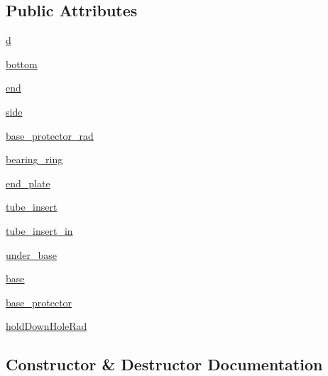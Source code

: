\subsection*{Public Attributes}
\begin{DoxyCompactItemize}
\item 
\hyperlink{classboxes_1_1_turret_a237b36a79f2060a19c9f445eb2c0b0c0}{d}
\item 
\hyperlink{classboxes_1_1_turret_a4175ec32cd0bc70355aaa2a7d46a1814}{bottom}
\item 
\hyperlink{classboxes_1_1_turret_af346dccee6a020fe485e1849d3597eaf}{end}
\item 
\hyperlink{classboxes_1_1_turret_a1f5dd6ea8b99161aefb38d331cb093f4}{side}
\item 
\hyperlink{classboxes_1_1_turret_aaae8d70aa9dbb9ece6843b17158e3756}{base\+\_\+protector\+\_\+rad}
\item 
\hyperlink{classboxes_1_1_turret_afe961dea5213247a7092ada092737eb9}{bearing\+\_\+ring}
\item 
\hyperlink{classboxes_1_1_turret_a272bc7853e19ca7a75349c6468be7aed}{end\+\_\+plate}
\item 
\hyperlink{classboxes_1_1_turret_a54964571038999e8bb1d1fdd7925d280}{tube\+\_\+insert}
\item 
\hyperlink{classboxes_1_1_turret_ae048a79551ef7acf28b6f4621a2ef5a4}{tube\+\_\+insert\+\_\+in}
\item 
\hyperlink{classboxes_1_1_turret_a1b7fc41b7419700d5ec007f56ba8a3cc}{under\+\_\+base}
\item 
\hyperlink{classboxes_1_1_turret_a7232707a55553fe266619e76b836313b}{base}
\item 
\hyperlink{classboxes_1_1_turret_a6f0186ebbe28ed264198027539752e1f}{base\+\_\+protector}
\item 
\hyperlink{classboxes_1_1_turret_a1ec72e74c3d0fec8d0723fb171a636fb}{hold\+Down\+Hole\+Rad}
\end{DoxyCompactItemize}


\subsection{Constructor \& Destructor Documentation}
\hypertarget{classboxes_1_1_turret_a61691e8112654e9fc0d7ea87ab8c7bc6}{}

